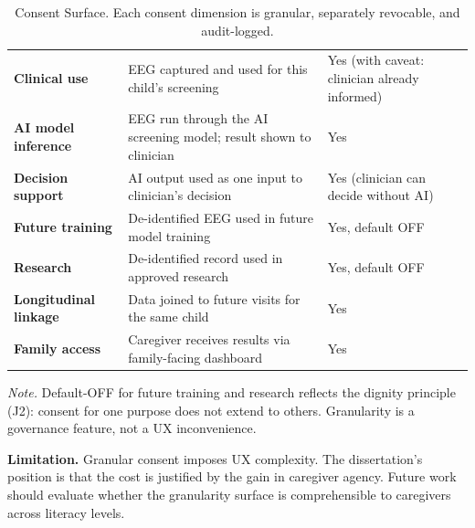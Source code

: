 {\tablestripes\tablefontsize
{}
\begin{xltabular}{\textwidth}{@{} >{\raggedright\arraybackslash}p{3.7cm} p{6.7cm} >{\centering\arraybackslash}p{3.9cm} @{}}
\caption[Consent Surface]{Consent Surface. Each consent dimension is granular, separately revocable, and audit-logged.}\label{tab:appj_consent} \\
\toprule
{} &  &  \\
\midrule
\endfirsthead
\endhead
\bottomrule
\endlastfoot
\textbf{Clinical use}        & EEG captured and used for this child's screening                                & Yes (with caveat: clinician already informed) \\
\textbf{AI model inference}  & EEG run through the AI screening model; result shown to clinician               & Yes \\
\textbf{Decision support}    & AI output used as one input to clinician's decision                              & Yes (clinician can decide without AI) \\
\textbf{Future training}     & De-identified EEG used in future model training                                  & Yes, default OFF \\
\textbf{Research}            & De-identified record used in approved research                                    & Yes, default OFF \\
\textbf{Longitudinal linkage} & Data joined to future visits for the same child                                   & Yes \\
\textbf{Family access}       & Caregiver receives results via family-facing dashboard                            & Yes \\
\end{xltabular}}
\vspace{0.4em}
\noindent\textit{Note.} Default-OFF for future training and research reflects the dignity principle (J2): consent for one purpose does not extend to others. Granularity is a governance feature, not a UX inconvenience.

\noindent\textbf{Limitation.} Granular consent imposes UX complexity. The dissertation's position is that the cost is justified by the gain in caregiver agency. Future work should evaluate whether the granularity surface is comprehensible to caregivers across literacy levels.

